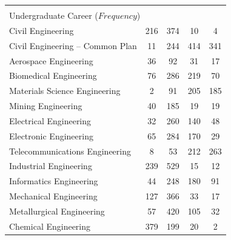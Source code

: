 \documentclass[5p,authoryear,preprint,12pt]{elsarticle}
\begin{document}
\begin{table}[htb]
{\begin{tabular}{lcccc}
			\multicolumn{5}{c}{}\\
			\multicolumn{5}{l}{Undergraduate Career ($Frequency$)} \\
			Civil Engineering & 216 & 374 & 10 &  4 \\ 
			Civil Engineering -- Common Plan & 11 & 244 & 414 & 341 \\ 
			Aerospace Engineering & 36 & 92 & 31 & 17 \\ 
			Biomedical Engineering & 76 & 286 & 219 & 70 \\ 
			Materials Science Engineering &  2 & 91 & 205 & 185 \\ 
			Mining Engineering & 40 & 185 & 19 & 19 \\ 
			Electrical Engineering & 32 & 260 & 140 & 48 \\ 
			Electronic Engineering & 65 & 284 & 170 & 29 \\ 
			Telecommunications Engineering &  8 & 53 & 212 & 263 \\ 
			Industrial Engineering & 239 & 529 & 15 & 12 \\ 
			Informatics Engineering & 44 & 248 & 180 & 91 \\ 
			Mechanical Engineering & 127 & 366 & 33 & 17 \\ 
			Metallurgical Engineering & 57 & 420 & 105 & 32 \\ 
			Chemical Engineering & 379 & 199 & 20 &  2 \\ 
			\bottomrule
		\end{tabular}
	}
\end{table}
\end{document}

